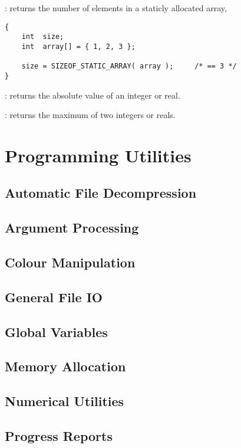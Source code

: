 :
returns the number of elements in a staticly allocated array,
\begin{verbatim}
{
    int  size;
    int  array[] = { 1, 2, 3 };

    size = SIZEOF_STATIC_ARRAY( array );     /* == 3 */
}
\end{verbatim}

:  returns the absolute value of an integer or real.

:  returns the maximum of two integers or reals.

\section{Programming Utilities}

\subsection{Automatic File Decompression}

\subsection{Argument Processing}

\subsection{Colour Manipulation}

\subsection{General File IO}

\subsection{Global Variables}

\subsection{Memory Allocation}

\subsection{Numerical Utilities}

\subsection{Progress Reports}

